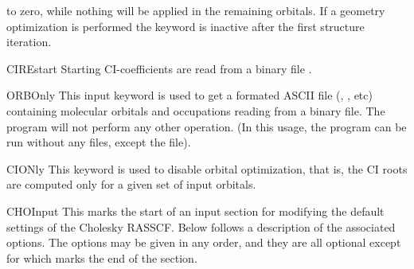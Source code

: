 \begin{keywordlist}
to zero, while nothing will be applied in the remaining orbitals.
If a geometry optimization is performed the keyword is inactive after
the first structure iteration.
\item[CIREstart]
Starting CI-coefficients are read from a binary file .
\item[ORBOnly]
This input keyword is used to get a formated ASCII file
(, , etc)
containing molecular orbitals and occupations reading from a
binary  file. The program will not perform any other operation.
(In this usage, the program can be run without any files, except the  file).
\item[CIONly]
This keyword is used to disable orbital optimization, that is,
the CI roots are computed only for a given set of input orbitals.
\item[CHOInput]
This marks the start of an input section for modifying
the default settings of the Cholesky RASSCF.
Below follows a description of the associated options.
The options may be given in any order,
and they are all optional except for
 which marks the end of the  section.


\end{keywordlist}
